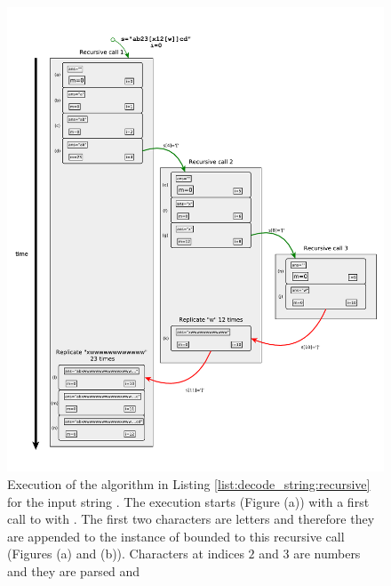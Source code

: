 

\begin{figure}
	
	\vspace{-3cm}

	\captionsetup{font=footnotesize,labelfont=footnotesize}
	\centering
	\hspace*{-1.5cm}
	\includegraphics[width=1.25\textwidth]{sources/decode_string/images/recursion}
	\vspace*{-10mm}
   \caption{Execution of the algorithm in Listing \ref{list:decode_string:recursive} for the input
	string . The execution starts (Figure (a)) with a first call to
	 with . The first two characters are letters
	and therefore they are appended to the instance of  bounded to this recursive call
	(Figures (a) and (b)). Characters at indices $2$ and $3$ are numbers and they are parsed and
}
\end{figure}
